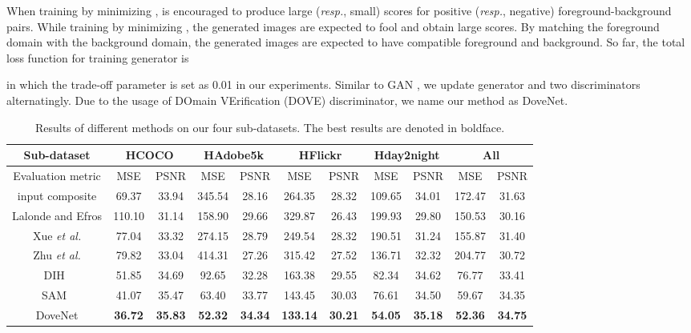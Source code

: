 \documentclass[10pt,twocolumn,letterpaper]{article}
\begin{document}
When training  by minimizing ,  is encouraged to produce large (\emph{resp.}, small) scores for positive (\emph{resp.}, negative) foreground-background pairs. While training  by minimizing , the generated images are expected to fool  and obtain large scores. By matching the foreground domain with the background domain, the generated images are expected to have compatible foreground and background. So far, the total loss function for training generator  is

in which the trade-off parameter  is set as 0.01 in our experiments. Similar to GAN \cite{goodfellow2014generative}, we update generator  and two discriminators  alternatingly. Due to the usage of DOmain VErification (DOVE) discriminator, we name our method as DoveNet.



\setlength{\tabcolsep}{5pt}
\begin{table*}[tb]
\centering
\begin{tabular}{|l|c|c|c|c|c|c|c|c|c|c|}
\hline
\multicolumn{1}{|c|}{Sub-dataset} & \multicolumn{2}{c|}{HCOCO} & \multicolumn{2}{c|}{HAdobe5k} & \multicolumn{2}{c|}{HFlickr} & \multicolumn{2}{c|}{Hday2night} & \multicolumn{2}{c|}{All}\\ \hline
\multicolumn{1}{|c|}{Evaluation metric} & MSE & PSNR & MSE & PSNR & MSE & PSNR & MSE & PSNR & MSE & PSNR \\ \hline
\multicolumn{1}{|c|}{input composite} & 69.37 & 33.94 & 345.54 & 28.16 & 264.35 & 28.32 & 109.65 & 34.01 & 172.47 & 31.63 \\ \hline
\multicolumn{1}{|c|}{Lalonde and Efros\cite{lalonde2007using}} & 110.10 & 31.14 & 158.90 & 29.66 & 329.87 & 26.43 & 199.93 & 29.80 & 150.53 & 30.16 \\ \hline
\multicolumn{1}{|c|}{Xue \emph{et al.}\cite{xue2012understanding}} & 77.04 & 33.32 & 274.15 & 28.79 & 249.54 & 28.32 & 190.51 & 31.24 & 155.87 & 31.40 \\ \hline
\multicolumn{1}{|c|}{Zhu \emph{et al.}\cite{zhu2015learning}} & 79.82 & 33.04 & 414.31 & 27.26 & 315.42 & 27.52 & 136.71 & 32.32 & 204.77 & 30.72 \\ \hline
\multicolumn{1}{|c|}{DIH~\cite{tsai2017deep}} & 51.85 & 34.69 & 92.65 & 32.28 & 163.38 & 29.55 & 82.34 & 34.62 & 76.77 & 33.41 \\ \hline
\multicolumn{1}{|c|}{SAM~\cite{xiaodong2019improving}} & 41.07 & 35.47 & 63.40 & 33.77 & 143.45 & 30.03 & 76.61 & 34.50 & 59.67 & 34.35 \\ \hline
\multicolumn{1}{|c|}{DoveNet} & \bf36.72 & \bf35.83 & \bf52.32 & \bf34.34 & \bf133.14 & \bf30.21 & \bf54.05 & \bf35.18 & \bf52.36 & \bf34.75 \\ \hline
\end{tabular}
\caption{Results of different methods on our four sub-datasets. The best results are denoted in boldface.}
\label{tab:baselines}
\end{table*}
\end{document}
